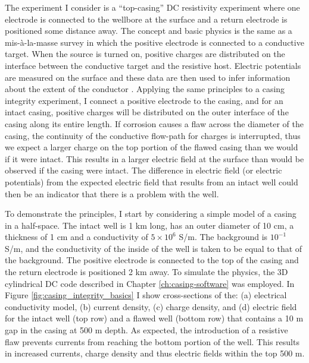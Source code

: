 The experiment I consider is a ``top-casing'' DC resistivity experiment where one electrode is connected to the wellbore at the surface and a return electrode is positioned some distance away. The concept and basic physics is the same as a mis-\`a-la-masse survey in which the positive electrode is connected to a conductive target. When the source is turned on, positive charges are distributed on the interface between the conductive target and the resistive host. Electric potentials are measured on the surface and these data are then used to infer information about the extent of the conductor \citep{Telford1990}. Applying the same principles to a casing integrity experiment, I connect a positive electrode to the casing, and for an intact casing, positive charges will be distributed on the outer interface of the casing along its entire length. If corrosion causes a flaw across the diameter of the casing, the continuity of the conductive flow-path for charges is interrupted, thus we expect a larger charge on the top portion of the flawed casing than we would if it were intact. This results in a larger electric field at the surface than would be observed if the casing were intact. The difference in electric field (or electric potentials) from the expected electric field that results from an intact well could then be an indicator that there is a problem with the well.

To demonstrate the principles, I start by considering a simple model of a casing in a half-space. The intact well is 1 km long, has an outer diameter of 10 cm, a thickness of 1 cm and a conductivity of $5\times10^6$ S/m. The background is $10^{-1}$ S/m, and the conductivity of the inside of the well is taken to be equal to that of the background. The positive electrode is connected to the top of the casing and the return electrode is positioned 2 km away. To simulate the physics, the 3D cylindrical DC code described in Chapter \ref{ch:casing-software} was employed. In Figure \ref{fig:casing_integrity_basics} I show cross-sections of the: (a) electrical conductivity model, (b) current density, (c) charge density, and (d) electric field for the intact well (top row)  and a flawed well (bottom row) that contains a 10 m gap in the casing at 500 m depth. As expected, the introduction of a resistive flaw prevents currents from reaching the bottom portion of the well. This results in increased currents, charge density and thus electric fields within the top 500 m.


